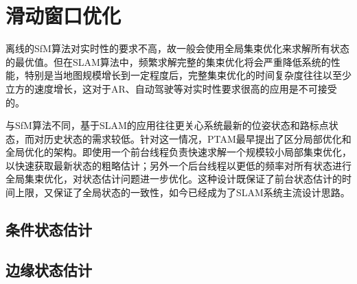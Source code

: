 \section{滑动窗口优化}

离线的SfM算法对实时性的要求不高，故一般会使用全局集束优化来求解所有状态的最优值。但在SLAM算法中，频繁求解完整的集束优化将会严重降低系统的性能，特别是当地图规模增长到一定程度后，完整集束优化的时间复杂度往往以至少立方的速度增长，这对于AR、自动驾驶等对实时性要求很高的应用是不可接受的。

与SfM算法不同，基于SLAM的应用往往更关心系统最新的位姿状态和路标点状态，而对历史状态的需求较低。针对这一情况，PTAM\citep{klein2007parallel}最早提出了区分局部优化和全局优化的架构。即使用一个前台线程负责快速求解一个规模较小局部集束优化，以快速获取最新状态的粗略估计；另外一个后台线程以更低的频率对所有状态进行全局集束优化，对状态估计问题进一步优化。这种设计既保证了前台状态估计的时间上限，又保证了全局状态的一致性，如今已经成为了SLAM系统主流设计思路。

\subsection{条件状态估计}

\subsection{边缘状态估计}

